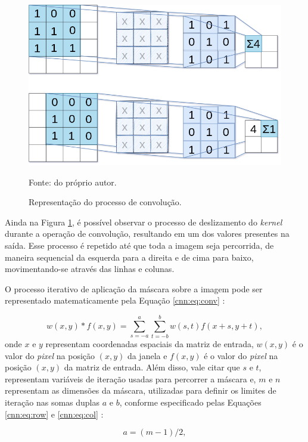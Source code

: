 \begin{figure}[H]
    \centering
    \caption{Representação do processo de convolução.}
    \includegraphics[width=1\linewidth]{recursos/imagens/deep/2d_convolution.png}
    \label{cnn:fig:6}

    Fonte: do próprio autor.
\end{figure}

Ainda na Figura \ref{cnn:fig:6}, é possível observar o processo de deslizamento do \textit{kernel} durante a operação de convolução, resultando em um dos valores presentes na saída. Esse processo é repetido até que toda a imagem seja percorrida, de maneira sequencial da esquerda para a direita e de cima para baixo, movimentando-se através das linhas e colunas.

O processo iterativo de aplicação da máscara sobre a imagem pode ser representado matematicamente pela Equação \ref{cnn:eq:conv} \citep{Gonzalez2009}:

\begin{equation}
    \label{cnn:eq:conv}
    w(x,y)*f(x,y) = \sum\limits_{s=-a}^a \sum\limits_{t=-b}^b w(s,t)f(x+s,y+t),
\end{equation}
onde $x$ e $y$ representam coordenadas espaciais da matriz de entrada, $w(x,y)$ é o valor do \textit{pixel} na posição $(x,y)$ da janela e $f(x,y)$ é o valor do \textit{pixel} na posição $(x,y)$ da matriz de entrada. Além disso, vale citar que $s$ e $t$, representam variáveis de iteração usadas para percorrer a máscara e, $m$ e $n$ representam as dimensões da máscara, utilizadas para definir os limites de iteração nas somas duplas $a$ e $b$, conforme especificado pelas Equações \ref{cnn:eq:row} e \ref{cnn:eq:col} \citep{Gonzalez2009}:

\begin{equation} 
   \label{cnn:eq:row}
   a = (m-1)/2,
\end{equation}

